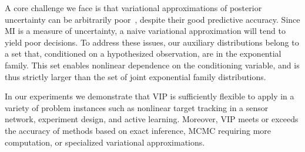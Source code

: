 
A core challenge we face is that variational approximations of
posterior uncertainty can be arbitrarily
poor~\citep{giordano2015linear, turner2011two}, despite their good
predictive accuracy.  Since MI is a measure of uncertainty, a naive
variational approximation will tend to yield poor decisions.  To
address these issues, our auxiliary distributions belong to a set
that, conditioned on a hypothesized observation, are in the
exponential family.  This set enables nonlinear dependence on the
conditioning variable, and is thus strictly larger than the set of
joint exponential family distributions.

In our experiments we demonstrate that VIP is sufficiently flexible to
apply in a variety of problem instances such as nonlinear target
tracking in a sensor network, experiment design, and active learning.
Moreover, VIP meets or exceeds the accuracy of methods based on exact
inference, MCMC requiring more computation, or specialized variational
approximations. 



